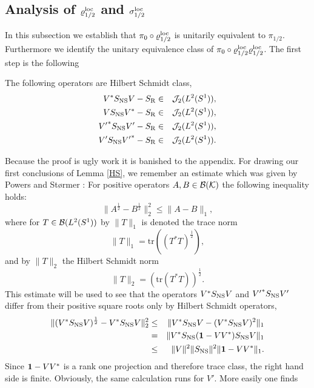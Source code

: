 \documentclass[10pt,a4paper]{article}
\begin{document}
\subsection{Analysis of $\varrho_{1/2}^{\rm loc}$
and $\sigma_{1/2}^{\rm loc}$}
In this subsection we establish that
$\pi_0\circ\varrho_{1/2}^{\rm loc}$ is unitarily
equivalent to $\pi_{1/2}$. Furthermore we identify
the unitary equivalence class of
$\pi_0\circ\varrho_{1/2}^{\rm loc}\varrho_{1/2}^{\rm loc}$.
The first step is the following
\begin{lemma}
\label{HS}
The following operators are Hilbert Schmidt class,
\begin{eqnarray}
\label{HS1}
V^* S_{\rm NS} V - S_{\rm R} &\in& {\cal J}_2(L^2(S^1)),\\
\label{HS2}
V S_{\rm NS} V^* - S_{\rm R} &\in& {\cal J}_2(L^2(S^1)),\\
{V'}^* S_{\rm NS} V' - S_{\rm R} &\in& {\cal J}_2(L^2(S^1)),\\
V' S_{\rm NS} {V'}^* - S_{\rm R} &\in& {\cal J}_2(L^2(S^1)).
\end{eqnarray}
\end{lemma}
Because the proof is ugly work it is banished to the
appendix. For drawing our first conclusions of Lemma
\ref{HS}, we remember an estimate which was given by
Powers and St{\o}rmer \cite{Pow}: For positive operators
$A,B\in{\cal B}({\cal K})$ the following inequality holds:
\begin{equation}
\label{normest}
\| A^\frac{1}{2}-B^\frac{1}{2} \|_2^2 \le \| A-B \|_1,
\end{equation}
where for $T\in{\cal B}(L^2(S^1))$ by $\|T\|_1$ is denoted
the trace norm
\[ \|T\|_1 = \mbox{tr}\left((T^*T)^\frac{1}{2}\right),\]
and by $\|T\|_2$ the Hilbert Schmidt norm
\[ \| T \|_2 = ( \mbox{tr} (T^*T) )^\frac{1}{2}. \]
This estimate will be used to see that the operators
$V^*S_{\rm NS}V$ and ${V'}^*S_{\rm NS}V'$ differ from their
positive square roots only by Hilbert Schmidt operators,
\begin{eqnarray*}
\| (V^*S_{\rm NS}V)^\frac{1}{2} - V^*S_{\rm NS}V \|_2^2 &\le&
\| V^*S_{\rm NS}V - (V^*S_{\rm NS}V)^2 \|_1 \\ &=&
\| V^*S_{\rm NS}({\bf 1}-VV^*)S_{\rm NS}V \|_1 \\
&\le& \| V \|^2 \|S_{\rm NS}\|^2 \|{\bf 1}-VV^*\|_1.
\end{eqnarray*}
Since ${\bf 1}-VV^*$ is a rank one projection and
therefore trace class, the right hand side is finite.
Obviously, the same calculation runs for $V'$.
More easily one finds
\end{document}
